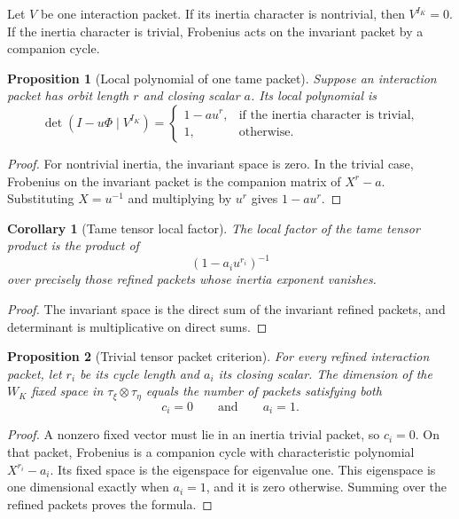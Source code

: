 \documentclass[11pt]{amsart}
\newtheorem{proposition}[proposition]{Proposition}
\newtheorem{corollary}[corollary]{Corollary}
\theoremstyle{definition}
\theoremstyle{remark}
\begin{document}
Let \(V\) be one interaction packet. If its inertia character is nontrivial, then \(V^{I_K}=0\). If the inertia character is trivial, Frobenius acts on the invariant packet by a companion cycle.

\begin{proposition}[Local polynomial of one tame packet]\label{prop:tame_local_polynomial}
Suppose an interaction packet has orbit length \(r\) and closing scalar \(a\). Its local polynomial is
\[
\det\left(I-u\Phi\mid V^{I_K}\right)
=
\begin{cases}
1-a u^r,&\text{if the inertia character is trivial},\\
1,&\text{otherwise}.
\end{cases}
\]
\end{proposition}

\begin{proof}
For nontrivial inertia, the invariant space is zero. In the trivial case, Frobenius on the invariant packet is the companion matrix of \(X^r-a\). Substituting \(X=u^{-1}\) and multiplying by \(u^r\) gives \(1-a u^r\).
\end{proof}

\begin{corollary}[Tame tensor local factor]\label{cor:tame_tensor_factor}
The local factor of the tame tensor product is the product of
\[
(1-a_i u^{r_i})^{-1}
\]
over precisely those refined packets whose inertia exponent vanishes.
\end{corollary}

\begin{proof}
The invariant space is the direct sum of the invariant refined packets, and determinant is multiplicative on direct sums.
\end{proof}

\begin{proposition}[Trivial tensor packet criterion]\label{prop:trivial_tensor_packet}
For every refined interaction packet, let \(r_i\) be its cycle length and \(a_i\) its closing scalar. The dimension of the \(W_K\) fixed space in \(\tau_\xi\otimes\tau_\eta\) equals the number of packets satisfying both
\[
c_i=0
\qquad\text{and}\qquad
a_i=1.
\]
\end{proposition}

\begin{proof}
A nonzero fixed vector must lie in an inertia trivial packet, so \(c_i=0\). On that packet, Frobenius is a companion cycle with characteristic polynomial \(X^{r_i}-a_i\). Its fixed space is the eigenspace for eigenvalue one. This eigenspace is one dimensional exactly when \(a_i=1\), and it is zero otherwise. Summing over the refined packets proves the formula.
\end{proof}
\end{document}
